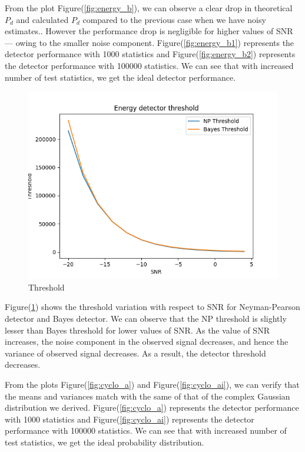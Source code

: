 \documentclass[a4 paper]{article}
\begin{document}
From the plot Figure(\ref{fig:energy_b}), we can observe a clear drop in theoretical $P_{d}$ and calculated $P_{d}$ compared to the previous case when we have noisy estimates.. However the performance drop is negligible for higher values of SNR --- owing to the smaller noise component. Figure(\ref{fig:energy_b1}) represents the detector performance with 1000 statistics and Figure(\ref{fig:energy_b2}) represents the detector performance with 100000 statistics. We can see that with increased number of test statistics, we get the ideal detector performance. 


\vspace{-2em}
\begin{figure}[h]
	\centering
	\includegraphics[width=0.75\linewidth]{../results/energy_detector_c.png}
	\caption{Threshold}
	\label{fig:energy_c}
\end{figure}

Figure(\ref{fig:energy_c}) shows the threshold variation with respect to SNR for Neyman-Pearson detector and Bayes detector. We can observe that the NP threshold is slightly lesser than Bayes threshold for lower values of SNR. As the value of SNR increases, the noise component in the observed signal decreases, and hence the variance of observed signal decreases. As a result, the detector threshold decreases.



\newpage

\vspace{-2em}
\vspace{-1em}


From the plots Figure(\ref{fig:cyclo_a}) and Figure(\ref{fig:cyclo_ai}), we can verify that the means and variances match with the same of that of the complex Gaussian distribution we derived. Figure(\ref{fig:cyclo_a}) represents the detector performance with 1000 statistics and Figure(\ref{fig:cyclo_ai}) represents the detector performance with 100000 statistics. We can see that with increased number of test statistics, we get the ideal probability distribution. 
\end{document}
